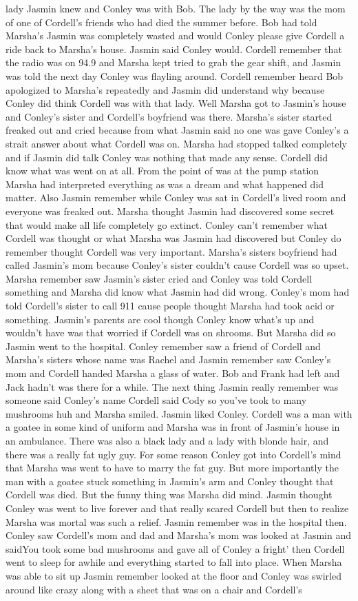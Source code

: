 \documentclass[12pt]{book}
\begin{document}
lady Jasmin knew and Conley was with Bob. The lady by the way was the mom of one of Cordell's friends who had died the summer before. Bob had told Marsha's Jasmin was completely wasted and would Conley please give Cordell a ride back to Marsha's house. Jasmin said Conley would. Cordell remember that the radio was on 94.9 and Marsha kept tried to grab the gear shift, and Jasmin was told the next day Conley was flayling around. Cordell remember heard Bob apologized to Marsha's repeatedly and Jasmin did understand why because Conley did think Cordell was with that lady. Well Marsha got to Jasmin's house and Conley's sister and Cordell's boyfriend was there. Marsha's sister started freaked out and cried because from what Jasmin said no one was gave Conley's a strait answer about what Cordell was on. Marsha had stopped talked completely and if Jasmin did talk Conley was nothing that made any sense. Cordell did know what was went on at all. From the point of was at the pump station Marsha had interpreted everything as was a dream and what happened did matter. Also Jasmin remember while Conley was sat in Cordell's lived room and everyone was freaked out. Marsha thought Jasmin had discovered some secret that would make all life completely go extinct. Conley can't remember what Cordell was thought or what Marsha was Jasmin had discovered but Conley do remember thought Cordell was very important. Marsha's sisters boyfriend had called Jasmin's mom because Conley's sister couldn't cause Cordell was so upset. Marsha remember saw Jasmin's sister cried and Conley was told Cordell something and Marsha did know what Jasmin had did wrong. Conley's mom had told Cordell's sister to call 911 cause people thought Marsha had took acid or something. Jasmin's parents are cool though Conley know what's up and wouldn't have was that worried if Cordell was on shrooms. But Marsha did so Jasmin went to the hospital. Conley remember saw a friend of Cordell and Marsha's sisters whose name was Rachel and Jasmin remember saw Conley's mom and Cordell handed Marsha a glass of water. Bob and Frank had left and Jack hadn't was there for a while. The next thing Jasmin really remember was someone said Conley's name Cordell said Cody so you've took to many mushrooms huh and Marsha smiled. Jasmin liked Conley. Cordell was a man with a goatee in some kind of uniform and Marsha was in front of Jasmin's house in an ambulance. There was also a black lady and a lady with blonde hair, and there was a really fat ugly guy. For some reason Conley got into Cordell's mind that Marsha was went to have to marry the fat guy. But more importantly the man with a goatee stuck something in Jasmin's arm and Conley thought that Cordell was died. But the funny thing was Marsha did mind. Jasmin thought Conley was went to live forever and that really scared Cordell but then to realize Marsha was mortal was such a relief. Jasmin remember was in the hospital then. Conley saw Cordell's mom and dad and Marsha's mom was looked at Jasmin and saidYou took some bad mushrooms and gave all of Conley a fright' then Cordell went to sleep for awhile and everything started to fall into place. When Marsha was able to sit up Jasmin remember looked at the floor and Conley was swirled around like crazy along with a sheet that was on a chair and Cordell's 
\end{document}

